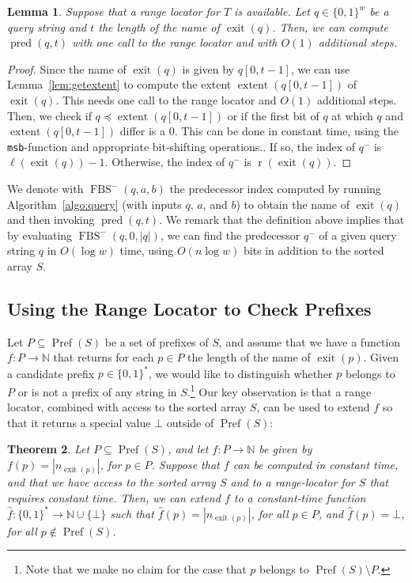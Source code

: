 \documentclass[a4paper,11pt]{article}
\newtheorem{theorem}{Theorem}[section]
\newtheorem{lemma}[theorem]{Lemma}
\newcommand{\N}{\mathbb{N}}
\newcommand{\?}{\mskip1.5mu}
\DeclareMathOperator{\exit}{exit}
\DeclareMathOperator{\lrange}{\ell}
\DeclareMathOperator{\rrange}{r}
\DeclareMathOperator{\extent}{extent}
\DeclareMathOperator{\Pref}{Pref}
\DeclareMathOperator{\pred}{pred}
\DeclareMathOperator{\fbs}{FBS}
\begin{document}
\begin{lemma}
Suppose that a range locator for $T$ is available.
Let $q \in \{0, 1\}^w$ be a query string and
$t$ the length of the name of $\exit(q)$.
Then, we can compute $\pred(q, t)$ with one 
call to the range locator and with $O(1)$ additional
steps.
\end{lemma}
\begin{proof}
Since the name of $\exit(q)$ is given by $q[0, t - 1]$,
we can use Lemma~\ref{lem:getextent} to compute
the extent $\extent(q[0, t - 1])$ of $\exit(q)$.
This needs one call to the range locator and $O(1)$ 
additional steps.
Then, we check if $q \preceq \extent(q[0, t - 1])$ or 
if the first bit of 
$q$ at which $q$ and $\extent(q[0, t-1])$ differ is a $0$. 
This can be done in constant time, using the \texttt{msb}-function
and appropriate bit-shifting operations..
If so, the index of $q^-$ is $\lrange(\exit(q))-1$.
Otherwise, the index of $q^-$ is 
    $\rrange(\exit(q))$.
\end{proof}

We denote with $\fbs^-(q,a,b)$ the predecessor index computed by 
running Algorithm~\ref{algo:query} (with inputs $q$, $a$, and $b$) 
to obtain the name of $\exit(q)$ and then invoking $\pred(q, t)$.
We remark that the definition above implies that 
by evaluating $\fbs^-(q,0,|q|)$, we can find
the predecessor $q^-$ of a given query string $q$ 
in $O(\log w)$ time, using 
$O(n\log w)$ bits in addition to the sorted array $S$.

\subsection{Using the Range Locator to Check Prefixes}

Let $P \subseteq \Pref(S)$ be a set of prefixes of $S$, and
assume that we have a function $f : P \rightarrow \N$ that 
returns for each $p \in P$ the length of the name of 
$\exit(p)$.
Given a candidate prefix $p \in \{0, 1\}^*$, we would like 
to distinguish whether $p$ belongs 
to $P$ or is not a prefix of any string in $S$.\footnote{Note
that we make no claim for the case that $p$ belongs to
$\Pref(S) \setminus P$.}
Our key observation is that a range locator, combined with access 
to the sorted array $S$, can be used to extend 
$f$ so that it returns a special value $\bot$ outside of $\Pref(S)$:

\begin{theorem}
\label{th:pref}
Let $P \subseteq\Pref(S)$, and let $f: P \rightarrow \N$ be 
given by $f(p) = |n_{\exit(p)}|$, for $p \in P$.
Suppose that $f$ can be computed in constant time,
and that we have access to the sorted
array $S$ and to a range-locator for $S$ that
requires constant time.
Then, we can extend 
$f$ to a constant-time function $\widehat{f}: \{0, 1\}^* \rightarrow \N
\cup \{ \bot \}$ such that $\widehat{f}(p)=|n_{\exit(p)}|$, for 
all $p \in P$, and $\widehat{f}(p) = \bot$, for
all $p \not\in\Pref(S)$.
\end{theorem}
\end{document}
